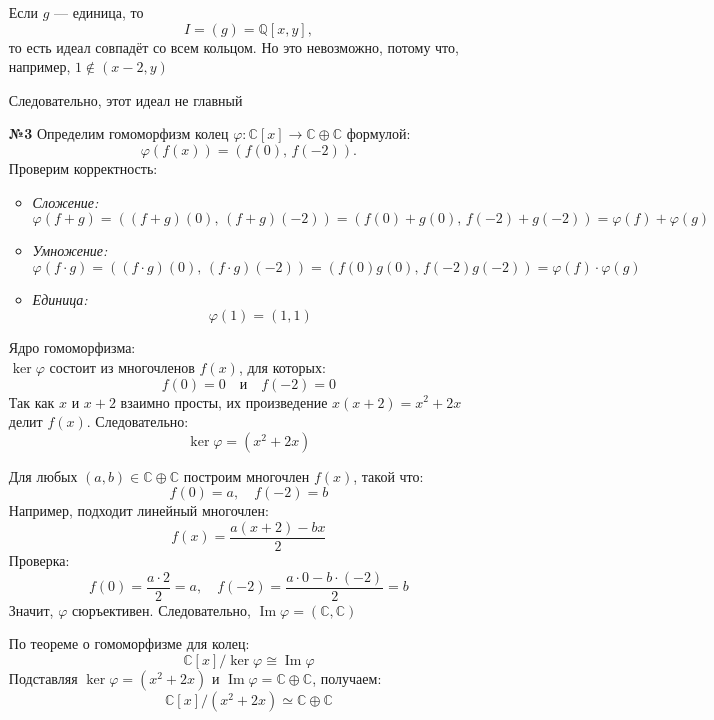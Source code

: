 \documentclass[a4paper]{article}
\renewcommand{\Im}{\operatorname{Im}}
\renewcommand{\phi}{\varphi}
\newcommand{\QQ}{\mathbb{Q}}
\begin{document}
\begin{enumerate}
    Если \(g\) — единица, то  
    \[
        I=(g)=\QQ[x,y],
    \]
    то есть идеал совпадёт со всем кольцом. Но это невозможно, потому что, например,  \(1 \notin (x-2,y)\)

    Следовательно, этот идеал не главный\\

    \item[\textbf{№3}]Определим гомоморфизм колец \(\phi: \mathbb{C}[x] \to \mathbb{C} \oplus \mathbb{C}\) формулой:
    \[
    \phi(f(x)) = \left(f(0),\, f(-2)\right).
    \]
    Проверим корректность:
    \begin{itemize}
        \item \textit{Сложение:} 
        \[
        \phi(f + g) = \left((f + g)(0),\, (f + g)(-2)\right) = \left(f(0) + g(0),\, f(-2) + g(-2)\right) = \phi(f) + \phi(g)
        \]
        \item \textit{Умножение:} 
        \[
        \phi(f \cdot g) = \left((f \cdot g)(0),\, (f \cdot g)(-2)\right) = \left(f(0)g(0),\, f(-2)g(-2)\right) = \phi(f) \cdot \phi(g)
        \]
        \item \textit{Единица:} 
        \[
        \phi(1) = (1, 1)
        \]
    \end{itemize}

    Ядро гомоморфизма: \\
    \(\ker\phi\) состоит из многочленов \(f(x)\), для которых:
    \[
    f(0) = 0 \quad \text{и} \quad f(-2) = 0
    \]
    Так как \(x\) и \(x + 2\) взаимно просты, их произведение \(x(x + 2) = x^2 + 2x\) делит \(f(x)\). Следовательно:
    \[
    \ker\phi = (x^2 + 2x)
    \]

    Для любых \((a, b) \in \mathbb{C} \oplus \mathbb{C}\) построим многочлен \(f(x)\), такой что:
    \[
    f(0) = a, \quad f(-2) = b
    \]
    Например, подходит линейный многочлен:
    \[
    f(x) = \frac{a(x + 2) - b x}{2}
    \]
    Проверка:
    \[
    f(0) = \frac{a \cdot 2}{2} = a, \quad f(-2) = \frac{a \cdot 0 - b \cdot (-2)}{2} = b
    \]
    Значит, \(\phi\) сюръективен. Следовательно, $\Im \phi = (\mathbb{C}, \mathbb{C})$

    По теореме о гомоморфизме для колец:
    \[
    \mathbb{C}[x]/\ker\phi \cong \operatorname{Im}\phi
    \]
    Подставляя \(\ker\phi = (x^2 + 2x)\) и \(\operatorname{Im}\phi = \mathbb{C} \oplus \mathbb{C}\), получаем:
    \[
    \mathbb{C}[x]/(x^2 + 2x) \simeq \mathbb{C} \oplus \mathbb{C}
    \]
\end{enumerate}
\end{document}
